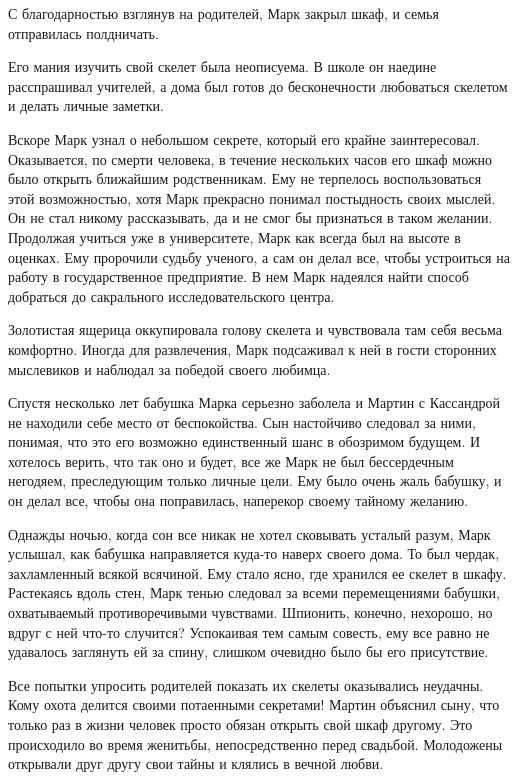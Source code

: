 С благодарностью взглянув на родителей, Марк закрыл шкаф, и семья отправилась 
полдничать.


Его мания изучить свой скелет была неописуема. В школе он наедине расспрашивал 
учителей, а дома был готов до бесконечности любоваться скелетом и делать личные 
заметки.

Вскоре Марк узнал о небольшом секрете, который его крайне заинтересовал. 
Оказывается, по смерти человека, в течение нескольких часов его шкаф можно было 
открыть ближайшим родственникам. Ему не терпелось воспользоваться этой 
возможностью, хотя Марк прекрасно понимал постыдность своих мыслей.
Он не стал никому рассказывать, да и не смог бы признаться в таком желании. 
Продолжая учиться уже в университете, Марк как всегда был на высоте в оценках. 
Ему пророчили судьбу ученого, а сам он делал все, чтобы устроиться на работу в 
государственное предприятие. В нем Марк надеялся найти способ добраться до 
сакрального исследовательского центра.

Золотистая ящерица оккупировала голову скелета и чувствовала там себя весьма 
комфортно. Иногда для развлечения, Марк подсаживал к ней в гости сторонних 
мыслевиков и наблюдал за победой своего любимца.

Спустя несколько лет бабушка Марка серьезно заболела и Мартин с Кассандрой не 
находили себе место от беспокойства. Сын настойчиво следовал за ними, понимая, 
что это его возможно единственный шанс в обозримом будущем. И хотелось верить, 
что так оно и будет, все же Марк не был бессердечным негодяем, преследующим 
только личные цели. Ему было очень жаль бабушку, и он делал все, чтобы она 
поправилась, наперекор своему тайному желанию.

Однажды ночью, когда сон все никак не хотел сковывать усталый разум, Марк 
услышал, как бабушка направляется куда-то наверх своего дома. То был чердак, 
захламленный всякой всячиной. Ему стало ясно, где хранился ее скелет в шкафу.
Растекаясь вдоль стен, Марк тенью следовал за всеми перемещениями бабушки, 
охватываемый противоречивыми чувствами. Шпионить, конечно, нехорошо, но вдруг с 
ней что-то случится? Успокаивая тем самым совесть, ему все равно не удавалось 
заглянуть ей за спину, слишком очевидно было бы его присутствие.

Все попытки упросить родителей показать их скелеты оказывались неудачны. Кому 
охота делится своими потаенными секретами! Мартин объяснил сыну, что только раз 
в жизни человек просто обязан открыть свой шкаф другому. Это происходило во 
время женитьбы, непосредственно перед свадьбой. Молодожены открывали друг другу 
свои тайны и клялись в вечной любви.


